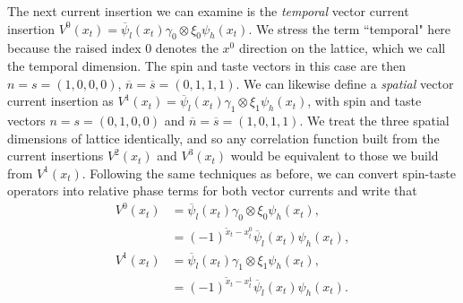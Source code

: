 The next current insertion we can examine is the \textit{temporal} vector current insertion $V^0(x_t)=\overline{\psi}_l(x_t) \gamma_0 \otimes \xi_0 \psi_h(x_t)$.  We stress the term ``temporal" here because the raised index $0$ denotes the $x^0$ direction on the lattice, which we call the temporal dimension.  The spin and taste vectors in this case are then $n=s=(1,0,0,0)$, $\overline{n}=\overline{s} = (0,1,1,1)$.  We can likewise define a \textit{spatial} vector current insertion as $V^1(x_t)=\overline{\psi}_l(x_t) \gamma_1 \otimes \xi_1 \psi_h(x_t)$, with spin and taste vectors $n=s=(0,1,0,0)$ and $\overline{n}=\overline{s} = (1,0,1,1)$.  We treat the three spatial dimensions of lattice identically, and so any correlation function built from the current insertions $V^2(x_t)$ and $V^3(x_t)$ would be equivalent to those we build from $V^1(x_t)$. Following the same techniques as before, we can convert spin-taste operators into relative phase terms for both vector currents and write that
\begin{equation}\label{eq:vec_define}
\begin{split}
    V^0(x_t) &= \overline{\psi}_l(x_t) \gamma_0 \otimes \xi_0 \psi_h(x_t),\\
             &= (-1)^{\tilde{x}_t - x^0_t}\overline{\psi}_l(x_t)\psi_h(x_t),\\
    V^1(x_t) &= \overline{\psi}_l(x_t) \gamma_1 \otimes \xi_1 \psi_h(x_t),\\
             &= (-1)^{\tilde{x}_t - x^1_t}\overline{\psi}_l(x_t)\psi_h(x_t).
\end{split}    
\end{equation}

